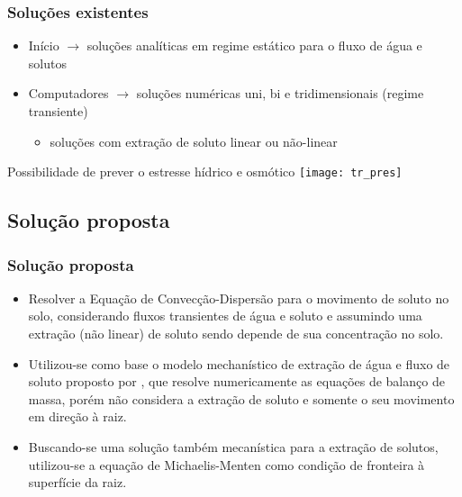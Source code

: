 \begin{frame}\frametitle{Soluções existentes}
    \begin{itemize}
    \item Início $\rightarrow$ soluções analíticas em regime estático para o fluxo de água e solutos
    \item Computadores $\rightarrow$ soluções numéricas uni, bi e tridimensionais (regime transiente)
      \begin{itemize}
	\item soluções com extração de soluto linear ou não-linear
      \end{itemize}
  \end{itemize}
  \centering
  Possibilidade de prever o estresse hídrico e osmótico
  \texttt{[image: tr\_pres]}\\
\end{frame}



\subsection{Solução proposta}
\begin{frame}\frametitle{Solução proposta}
  \begin{itemize}
    \item Resolver a Equação de Convecção-Dispersão para o movimento de soluto no solo, considerando fluxos transientes de água e soluto e assumindo uma extração (não linear) de soluto sendo depende de sua concentração no solo.

    \item Utilizou-se como base o modelo mechanístico de extração de água e fluxo de soluto proposto por \cite{liersolute},
  que resolve numericamente as equações de balanço de massa, porém não considera a extração de soluto e somente o seu movimento em direção à raiz.

    \item Buscando-se uma solução também mecanística para a extração de solutos, utilizou-se a equação de Michaelis-Menten como condição de fronteira à superfície da raiz.
  \end{itemize}
\end{frame}

